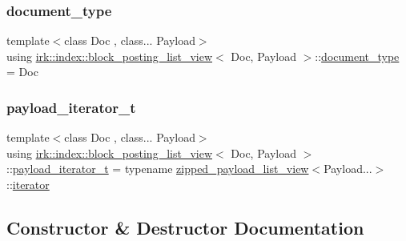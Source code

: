 \subsubsection{\texorpdfstring{document\+\_\+type}{document\_type}}
{\footnotesize\ttfamily template$<$class Doc , class... Payload$>$ \\
using \mbox{\hyperlink{classirk_1_1index_1_1block__posting__list__view}{irk\+::index\+::block\+\_\+posting\+\_\+list\+\_\+view}}$<$ Doc, Payload $>$\+::\mbox{\hyperlink{classirk_1_1index_1_1block__posting__list__view_a4a778116d22c9cf347f38da132ca0900}{document\+\_\+type}} =  Doc}

\mbox{\label{classirk_1_1index_1_1block__posting__list__view_ad7beed21d25c7cb3b2b389c28022be12}} 
\subsubsection{\texorpdfstring{payload\+\_\+iterator\+\_\+t}{payload\_iterator\_t}}
{\footnotesize\ttfamily template$<$class Doc , class... Payload$>$ \\
using \mbox{\hyperlink{classirk_1_1index_1_1block__posting__list__view}{irk\+::index\+::block\+\_\+posting\+\_\+list\+\_\+view}}$<$ Doc, Payload $>$\+::\mbox{\hyperlink{classirk_1_1index_1_1block__posting__list__view_ad7beed21d25c7cb3b2b389c28022be12}{payload\+\_\+iterator\+\_\+t}} =  typename \mbox{\hyperlink{classirk_1_1index_1_1zipped__payload__list__view}{zipped\+\_\+payload\+\_\+list\+\_\+view}}$<$Payload...$>$\+::\mbox{\hyperlink{classirk_1_1index_1_1block__posting__list__view_1_1iterator}{iterator}}}



\subsection{Constructor \& Destructor Documentation}
\mbox{\label{classirk_1_1index_1_1block__posting__list__view_a09936613ed78d60fc695429ab4315d24}} 
